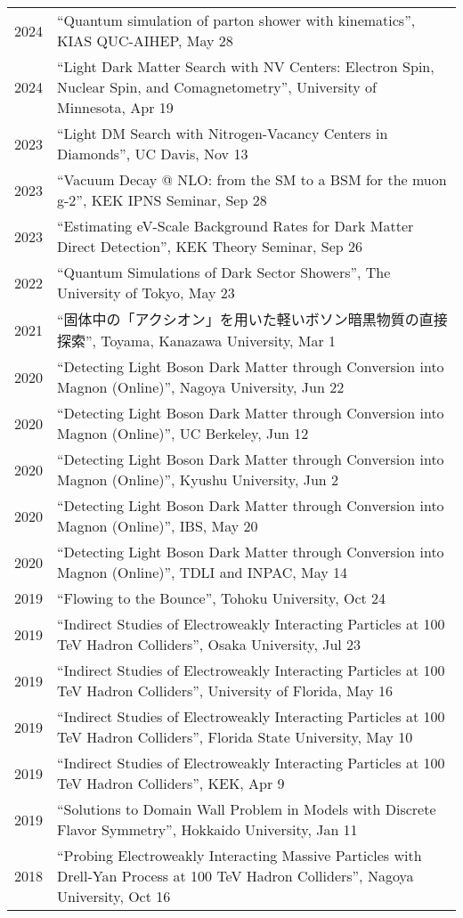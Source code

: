\documentclass[12pt]{article}
\begin{document}
\begin{table}[H]\begin{tabular}{lp{6in}}2024 & ``Quantum simulation of parton shower with kinematics'', KIAS QUC-AIHEP, May 28 \\2024 & ``Light Dark Matter Search with NV Centers: Electron Spin, Nuclear Spin, and Comagnetometry'', University of Minnesota, Apr 19 \\2023 & ``Light DM Search with Nitrogen-Vacancy Centers in Diamonds'', UC Davis, Nov 13 \\2023 & ``Vacuum Decay @ NLO: from the SM to a BSM for the muon g-2'', KEK IPNS Seminar, Sep 28 \\2023 & ``Estimating eV-Scale Background Rates for Dark Matter Direct Detection'', KEK Theory Seminar, Sep 26 \\2022 & ``Quantum Simulations of Dark Sector Showers'', The University of Tokyo, May 23 \\2021 & ``固体中の「アクシオン」を用いた軽いボソン暗黒物質の直接探索'', Toyama, Kanazawa University, Mar 1 \\2020 & ``Detecting Light Boson Dark Matter through Conversion into Magnon (Online)'', Nagoya University, Jun 22 \\2020 & ``Detecting Light Boson Dark Matter through Conversion into Magnon (Online)'', UC Berkeley, Jun 12 \\2020 & ``Detecting Light Boson Dark Matter through Conversion into Magnon (Online)'', Kyushu University, Jun 2 \\2020 & ``Detecting Light Boson Dark Matter through Conversion into Magnon (Online)'', IBS, May 20 \\2020 & ``Detecting Light Boson Dark Matter through Conversion into Magnon (Online)'', TDLI and INPAC, May 14 \\2019 & ``Flowing to the Bounce'', Tohoku University, Oct 24 \\2019 & ``Indirect Studies of Electroweakly Interacting Particles at 100 TeV Hadron Colliders'', Osaka University, Jul 23 \\2019 & ``Indirect Studies of Electroweakly Interacting Particles at 100 TeV Hadron Colliders'', University of Florida, May 16 \\2019 & ``Indirect Studies of Electroweakly Interacting Particles at 100 TeV Hadron Colliders'', Florida State University, May 10 \\2019 & ``Indirect Studies of Electroweakly Interacting Particles at 100 TeV Hadron Colliders'', KEK, Apr 9 \\2019 & ``Solutions to Domain Wall Problem in Models with Discrete Flavor Symmetry'', Hokkaido University, Jan 11 \\2018 & ``Probing Electroweakly Interacting Massive Particles with Drell-Yan Process at 100 TeV Hadron Colliders'', Nagoya University, Oct 16 \\\end{tabular}\end{table}
\end{document}
